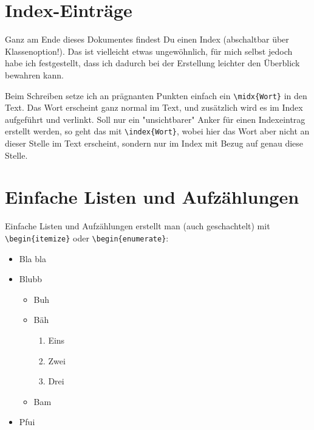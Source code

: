 \section{Index-Einträge}
\label{sec:Indexzeug}

Ganz am Ende dieses Dokumentes findest Du einen Index (abschaltbar über Klassenoption!). Das ist vielleicht etwas ungewöhnlich, für mich selbst jedoch habe ich festgestellt, dass ich dadurch bei der Erstellung leichter den Überblick bewahren kann.

Beim Schreiben setze ich an prägnanten Punkten einfach ein \verb|\midx{Wort}| in den Text. Das Wort erscheint ganz normal im Text, und zusätzlich wird es im Index aufgeführt und verlinkt. Soll nur ein "unsichtbarer" Anker für einen Indexeintrag erstellt werden, so geht das mit \verb|\index{Wort}|, wobei hier das Wort aber nicht an dieser Stelle im Text erscheint, sondern nur im Index mit Bezug auf genau diese Stelle.





\section{Einfache Listen und Aufzählungen}
\label{sec:Listen}

Einfache Listen und Aufzählungen erstellt man (auch geschachtelt) mit \verb|\begin{itemize}| oder \verb|\begin{enumerate}|:

\begin{onehalfspacing}
\begin{itemize}
\item Bla bla
\item Blubb
	\begin{itemize}
	\item Buh
	\item Bäh
	\begin{enumerate}
		\item Eins
		\item Zwei
		\item Drei
	\end{enumerate}
	\item Bam
	\end{itemize}
\item Pfui
\end{itemize}
\end{onehalfspacing}







